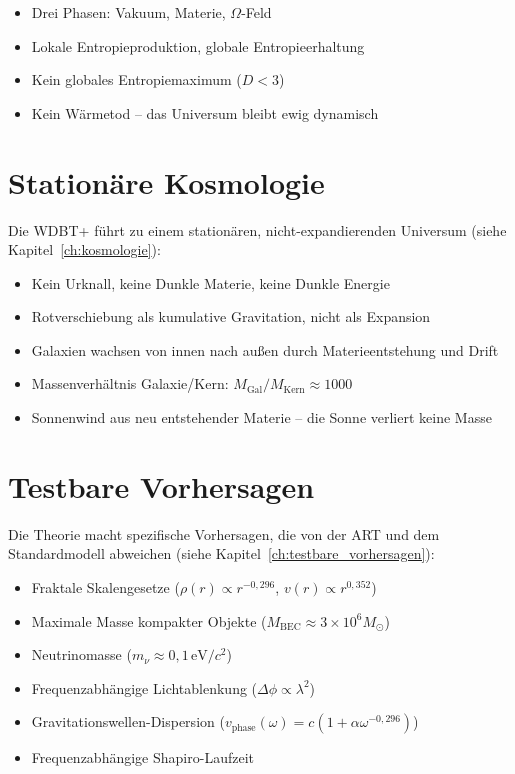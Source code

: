 \begin{itemize}
    \item Drei Phasen: Vakuum, Materie, \( \Omega \)-Feld
    \item Lokale Entropieproduktion, globale Entropieerhaltung
    \item Kein globales Entropiemaximum (\( D < 3 \))
    \item Kein Wärmetod – das Universum bleibt ewig dynamisch
\end{itemize}

\section{Stationäre Kosmologie}
\label{sec:kosmologie_zf}

Die WDBT+ führt zu einem stationären, nicht-expandierenden Universum (siehe Kapitel~\ref{ch:kosmologie}):

\begin{itemize}
    \item Kein Urknall, keine Dunkle Materie, keine Dunkle Energie
    \item Rotverschiebung als kumulative Gravitation, nicht als Expansion
    \item Galaxien wachsen von innen nach außen durch Materieentstehung und Drift
    \item Massenverhältnis Galaxie/Kern: \( M_{\text{Gal}}/M_{\text{Kern}} \approx 1000 \)
    \item Sonnenwind aus neu entstehender Materie – die Sonne verliert keine Masse
\end{itemize}

\section{Testbare Vorhersagen}
\label{sec:vorhersagen_zf}

Die Theorie macht spezifische Vorhersagen, die von der ART und dem Standardmodell abweichen (siehe Kapitel~\ref{ch:testbare_vorhersagen}):

\begin{itemize}
    \item Fraktale Skalengesetze (\( \rho(r) \propto r^{-0,296} \), \( v(r) \propto r^{0,352} \))
    \item Maximale Masse kompakter Objekte (\( M_{\text{BEC}} \approx 3 \times 10^6 M_\odot \))
    \item Neutrinomasse (\( m_\nu \approx 0,1 \, \text{eV}/c^2 \))
    \item Frequenzabhängige Lichtablenkung (\( \Delta\phi \propto \lambda^2 \))
    \item Gravitationswellen-Dispersion (\( v_{\text{phase}}(\omega) = c(1 + \alpha\omega^{-0,296}) \))
    \item Frequenzabhängige Shapiro-Laufzeit
\end{itemize}

